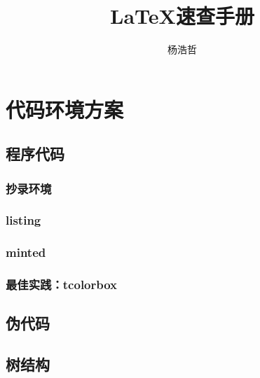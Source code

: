 \documentclass{article}
\title{\LaTeX{}速查手册}
\author{杨浩哲}
\begin{document}
    \maketitle
    \clearpage
    \renewcommand{\baselinestretch}{0.75}\normalsize
    \tableofcontents
    \listoffigures
    \listoftables
    \newpage
    \renewcommand{\baselinestretch}{1.3}\normalsize
    
    

    \section{代码环境方案}
    \subsection{程序代码}
    \subsubsection{抄录环境}
    \subsubsection{listing}
    \subsubsection{minted}
    \subsubsection{最佳实践：tcolorbox}
    \subsection{伪代码}
    
    \subsection{树结构}
\end{document}
